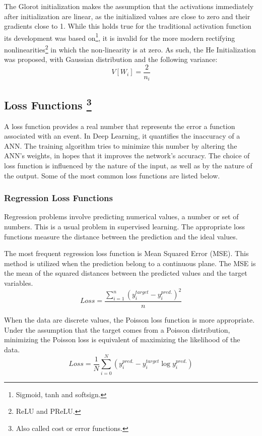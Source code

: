 The Glorot initialization makes the assumption that the activations immediately after initialization are linear, as the initialized values are close to zero and their gradients close to 1. While this holds true for the traditional activation function its development was based on\footnote{Sigmoid, tanh and softsign.}, it is invalid for the more modern rectifying nonlinearities\footnote{ReLU and PReLU.} in which the non-linearity is at zero. As such, the He Initialization \cite{He_Init_paper, Glorot_He_initialization} was proposed, with Gaussian distribution and the following variance:
\begin{equation}
	V \left[ W_i \right] = \frac{2}{n_i}
	\label{eqn:He Initialization variance}
\end{equation}


\subsection[Loss Functions]{Loss Functions \footnote{Also called cost or error functions.}}
A loss function\cite{loss_functions} provides a real number that represents the error a function associated with an event. In Deep Learning, it quantifies the inaccuracy of a ANN. The training algorithm tries to minimize this number by altering the ANN's weights, in hopes that it improves the network's accuracy. The choice of loss function is influenced by the nature of the input, as well as by the nature of the output. Some of the most common loss functions are listed below.

\subsubsection{Regression Loss Functions}
Regression problems involve predicting numerical values, a number or set of numbers. This is a usual problem in supervised learning. The appropriate loss functions measure the distance between the prediction and the ideal values.

The most frequent regression loss function is Mean Squared Error (MSE). This method is utilized when the prediction belong to a continuous plane. The MSE is the mean of the squared distances between the predicted values and the target variables.
\begin{equation}
    	Loss = \frac{ \sum_{i=1}^{n} \left( y_i^{target} - y_i^{pred.} \right)^2 } {n}
    	\label{eqn:Mean Squared Error}
\end{equation}

When the data are discrete values, the Poisson loss function is more appropriate. Under the assumption that the target comes from a Poisson distribution, minimizing the Poisson loss is equivalent of maximizing the likelihood of the data.
\begin{equation}
    	Loss = \frac{1}{N} \sum_{i=0}^{N} \left( y_i^{pred.} - y_i^{target}\log y_i^{pred.} \right)
    	\label{eqn:Poisson Error}
\end{equation}

